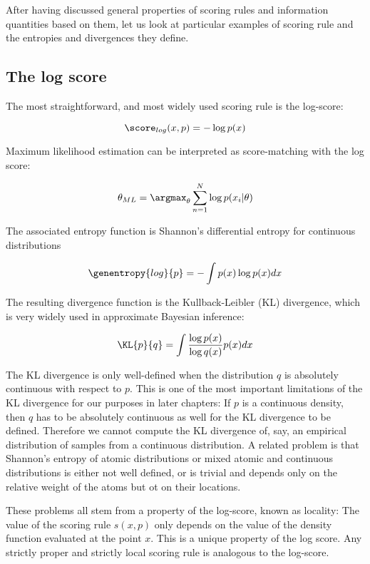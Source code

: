 After having discussed general properties of scoring rules and information quantities based on them, let us look at particular examples of scoring rule and the entropies and divergences they define.

\subsection{The log score}

The most straightforward, and most widely used scoring rule is the log-score:

\begin{equation}
	\score_{log}(x,p) = - \log p(x) 
\end{equation}

Maximum likelihood estimation can be interpreted as score-matching with the log score:

\begin{equation}
	\theta_{ML} = \argmax_{\theta} \sum_{n=1}^{N} \log p(x_i \vert \theta)
\end{equation}

The associated entropy function is Shannon's differential entropy for continuous distributions

\begin{equation}
	\genentropy{log}{p} = - \int p(x) \log p(x) dx
\end{equation}

The resulting divergence function is the Kullback-Leibler (KL) divergence, which is very widely used in approximate Bayesian inference:

\begin{equation}
	\KL{p}{q} = \int \frac{\log p(x)}{\log q(x)} p(x) dx
\end{equation}

The KL divergence is only well-defined when the distribution $q$ is absolutely continuous with respect to $p$. This is one of the most important limitations of the KL divergence for our purposes in later chapters: If $p$ is a continuous density, then $q$ has to be absolutely continuous as well for the KL divergence to be defined. Therefore we cannot compute the KL divergence of, say, an empirical distribution of samples from a continuous distribution. A related problem is that Shannon's entropy of atomic distributions or mixed atomic and continuous distributions is either not well defined, or is trivial and depends only on the relative weight of the atoms but ot on their locations.

These problems all stem from a property of the log-score, known as locality: The value of the scoring rule $s(x,p)$ only depends on the value of the density function evaluated at the point $x$. This is a unique property of the log score. Any strictly proper and strictly local scoring rule is analogous to the log-score.

